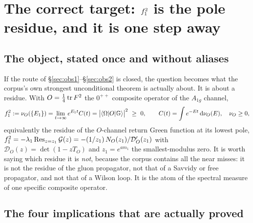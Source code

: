 \section[The correct target: the pole residue is one step away]{The correct target: $f_1^2$ is the pole residue, and it is one step away}
\label{sec:target}

\subsection{The object, stated once and without aliases}

If the route of \S\ref{sec:obs1}--\S\ref{sec:obs2} is closed, the question becomes what the
corpus's own strongest unconditional theorem is actually about. It is about a residue. With
$O=\tfrac14\operatorname{tr} F^{2}$ the $0^{++}$ composite operator of the $A_{1g}$ channel,
\begin{equation}
f_1^2:=\nu_O(\{E_1\})=\lim_{t\to\infty}e^{E_1t}C(t)
=\bigl|\langle\Omega|O|\mathbb{G}\rangle\bigr|^{2}\ \ge\ 0,
\qquad
C(t)=\int e^{-Et}\,\mathrm{d}\nu_O(E),\quad \nu_O\ge0,
\label{eq:f1def5}
\end{equation}
equivalently the residue of the $O$-channel return Green function at its lowest pole,
$f_1^2=-\lambda_1\operatorname{Res}_{z=z_1}\mathcal{G}(z)
=-(1/z_1)\,N_O(z_1)/\mathcal{D}_O'(z_1)$ with $\mathcal{D}_O(z)=\det(1-zT_O)$ and
$z_1=e^{am_1}$ the smallest-modulus zero. \LT{} It is worth saying which residue it is
\emph{not}, because the corpus contains all the near misses: it is not the residue of the gluon
propagator, not that of a Savvidy or free propagator, and not that of a Wilson loop. It is the
atom of the spectral measure of one specific composite operator.


\subsection{The four implications that are actually proved}

